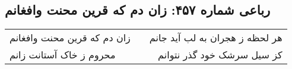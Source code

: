 \begin{center}
\section*{رباعی شماره ۴۵۷: زان دم که قرین محنت وافغانم}
\label{sec:sh457}
\begin{longtable}{l p{0.5cm} r}
زان دم که قرین محنت وافغانم
&&
هر لحظه ز هجران به لب آید جانم
\\
محروم ز خاک آستانت زانم
&&
کز سیل سرشک خود گذر نتوانم
\\
\end{longtable}
\end{center}
